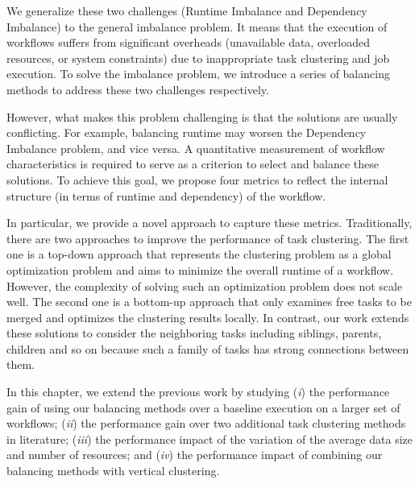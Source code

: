 We generalize these two challenges (Runtime Imbalance and Dependency Imbalance) to the general imbalance problem. It means that the execution of workflows suffers from significant overheads (unavailable data, overloaded resources, or system constraints) due to inappropriate task clustering and job execution. To solve the imbalance problem, we introduce a series of balancing methods to address these two challenges respectively. 



However, what makes this problem challenging is that the solutions are usually conflicting. For example, balancing runtime may worsen the Dependency Imbalance problem, and vice versa. A quantitative measurement of workflow characteristics is required to serve as a criterion to select and balance these solutions. To achieve this goal, we propose four metrics to reflect the internal structure (in terms of runtime and dependency) of the workflow. 

In particular, we provide a novel approach to capture these metrics. Traditionally, there are two approaches to improve the performance of task clustering. The first one is a top-down approach \cite{Integration2012} that represents the clustering problem as a global optimization problem and aims to minimize the overall runtime of a workflow. However, the complexity of solving such an optimization problem does not scale well. The second one is a bottom-up approach \cite{Muthuvelu2005}\cite{Liu2009} that only examines free tasks to be merged and optimizes the clustering results locally. In contrast, our work extends these solutions to consider the neighboring tasks including siblings, parents, children and so on because such a family of tasks has strong connections between them. 

In this chapter, we extend the previous work by studying (\emph{i}) the performance gain of using our balancing methods over a baseline execution on a larger set of workflows; (\emph{ii}) the performance gain over two additional task clustering methods in literature; (\emph{iii}) the performance impact of the variation of the average data size and number of resources; and (\emph{iv}) the performance impact of combining our balancing methods with vertical clustering.


